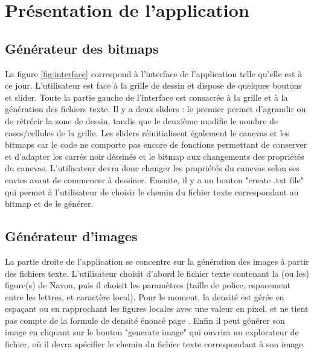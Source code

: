 \documentclass{article}
\begin{document}
\newpage
\section{Présentation de l'application}
\subsection{Générateur des bitmaps}
La figure \ref{fig:interface} correspond à l'interface de l'application telle qu'elle est à ce jour. L'utilisateur est face à la grille de dessin et dispose de quelques boutons et slider. Toute la partie gauche de l'interface est consacrée à la grille et à la génération des fichiers texte. Il y a deux sliders : le premier permet d'agrandir ou de rétrécir la zone de dessin, tandis que le deuxième modifie le nombre de cases/cellules de la grille. Les sliders réinitialisent également le canevas et les bitmaps car le code ne comporte pas encore de fonctions permettant de conserver et d'adapter les carrés noir déssinés et le bitmap aux changements des propriétés du canevas. L'utilisateur devra donc changer les propriétés du canevas selon ses envies avant de commencer à dessiner. Ensuite, il y a un bouton "create .txt file" qui permet à l'utilisateur de choisir le chemin du fichier texte correspondant au bitmap et de le générer. 

\subsection{Générateur d'images}
La partie droite de l'application se concentre sur la génération des images à partir des fichiers texte. L'utilisateur choisit d'abord le fichier texte contenant la (ou les) figure(s) de Navon, puis il choisit les paramètres (taille de police, espacement entre les lettres, et caractère local). Pour le moment, la densité est gérée en espaçant ou en rapprochant les figures locales avec une valeur en pixel, et ne tient pas compte de la formule de densité énoncé page \pageref{formule:equation_densité}. Enfin il peut générer son image en cliquant sur le bouton "generate image" qui ouvrira un explorateur de fichier, où il devra spécifier le chemin du fichier texte correspondant à son image.
\end{document}
